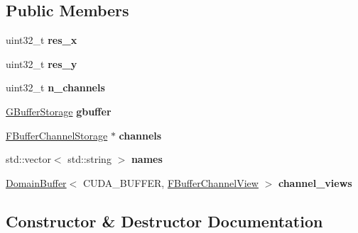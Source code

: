 \subsection*{Public Members}
\begin{DoxyCompactItemize}
\item 
\mbox{\label{struct_f_buffer_storage_a76f7b8f04b2e8ed2c486125f8fd1e721}} 
uint32\+\_\+t {\bfseries res\+\_\+x}
\item 
\mbox{\label{struct_f_buffer_storage_a6a40a1b48f157eed13cc51b966e2ecb4}} 
uint32\+\_\+t {\bfseries res\+\_\+y}
\item 
\mbox{\label{struct_f_buffer_storage_a42a730f4065270f34cbe3d8b41659745}} 
uint32\+\_\+t {\bfseries n\+\_\+channels}
\item 
\mbox{\label{struct_f_buffer_storage_a3fc8ddc50440995113655a8b07a93ec0}} 
\hyperlink{struct_g_buffer_storage}{G\+Buffer\+Storage} {\bfseries gbuffer}
\item 
\mbox{\label{struct_f_buffer_storage_a794bcc5c6267832be0126da3737d793a}} 
\hyperlink{struct_f_buffer_channel_storage}{F\+Buffer\+Channel\+Storage} $\ast$ {\bfseries channels}
\item 
\mbox{\label{struct_f_buffer_storage_a161a853023e1fd94642853908ab787ad}} 
std\+::vector$<$ std\+::string $>$ {\bfseries names}
\item 
\mbox{\label{struct_f_buffer_storage_a8c984b76bf6154b92bc27aa718b03258}} 
\hyperlink{class_domain_buffer}{Domain\+Buffer}$<$ C\+U\+D\+A\+\_\+\+B\+U\+F\+F\+ER, \hyperlink{struct_f_buffer_channel_view}{F\+Buffer\+Channel\+View} $>$ {\bfseries channel\+\_\+views}
\end{DoxyCompactItemize}


\subsection{Constructor \& Destructor Documentation}
\mbox{\label{struct_f_buffer_storage_a1d6dd4cf26b48a443630dc5bae600de8}} 
